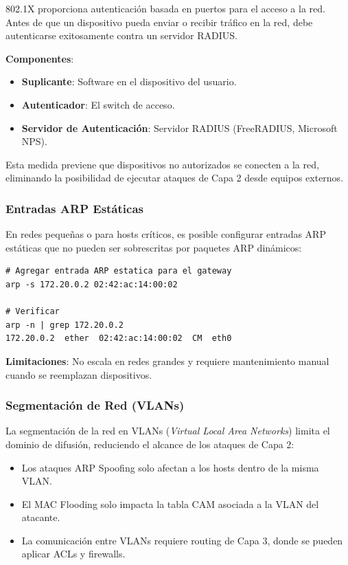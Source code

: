 \documentclass[12pt, a4paper]{article}
\begin{document}
802.1X proporciona autenticaci\'on basada en puertos para el acceso a la red. Antes de que un dispositivo pueda enviar o recibir tr\'afico en la red, debe autenticarse exitosamente contra un servidor RADIUS.

\textbf{Componentes}:
\begin{itemize}[leftmargin=2cm]
    \item \textbf{Suplicante}: Software en el dispositivo del usuario.
    \item \textbf{Autenticador}: El switch de acceso.
    \item \textbf{Servidor de Autenticaci\'on}: Servidor RADIUS (FreeRADIUS, Microsoft NPS).
\end{itemize}

Esta medida previene que dispositivos no autorizados se conecten a la red, eliminando la posibilidad de ejecutar ataques de Capa 2 desde equipos externos.

\subsubsection{Entradas ARP Est\'aticas}

En redes peque\~nas o para hosts cr\'iticos, es posible configurar entradas ARP est\'aticas que no pueden ser sobrescritas por paquetes ARP din\'amicos:

\begin{lstlisting}[style=bashstyle, caption={Configuraci\'on de ARP est\'atico en Linux}]
# Agregar entrada ARP estatica para el gateway
arp -s 172.20.0.2 02:42:ac:14:00:02

# Verificar
arp -n | grep 172.20.0.2
172.20.0.2  ether  02:42:ac:14:00:02  CM  eth0
\end{lstlisting}

\textbf{Limitaciones}: No escala en redes grandes y requiere mantenimiento manual cuando se reemplazan dispositivos.

\subsubsection{Segmentaci\'on de Red (VLANs)}

La segmentaci\'on de la red en VLANs (\textit{Virtual Local Area Networks}) limita el dominio de difusi\'on, reduciendo el alcance de los ataques de Capa 2:

\begin{itemize}[leftmargin=2cm]
    \item Los ataques ARP Spoofing solo afectan a los hosts dentro de la misma VLAN.
    \item El MAC Flooding solo impacta la tabla CAM asociada a la VLAN del atacante.
    \item La comunicaci\'on entre VLANs requiere routing de Capa 3, donde se pueden aplicar ACLs y firewalls.
\end{itemize}
\end{document}
